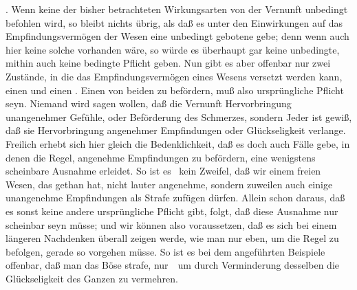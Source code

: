 \begin{aufza}
\begin{aufzb}
\item {}. Wenn keine der bisher betrachteten Wirkungsarten von der Vernunft unbedingt befohlen wird, so bleibt nichts übrig, als daß es unter den Einwirkungen auf das Empfindungsvermögen der Wesen eine unbedingt gebotene gebe; denn wenn auch hier keine solche vorhanden wäre, so würde es überhaupt gar keine unbedingte, mithin auch keine bedingte Pflicht geben. Nun gibt es aber offenbar nur zwei Zustände, in die das Empfindungsvermögen eines Wesens versetzt werden kann, einen  und einen . Einen von beiden zu befördern, muß also ursprüngliche Pflicht seyn. Niemand wird sagen wollen, daß die Vernunft Hervorbringung unangenehmer Gefühle, oder Beförderung des Schmerzes, sondern Jeder ist gewiß, daß sie Hervorbringung angenehmer Empfindungen oder Glückseligkeit verlange. Freilich erhebt sich hier gleich die Bedenklichkeit, daß es doch auch Fälle gebe, in denen die Regel, angenehme Empfindungen zu befördern, eine wenigstens scheinbare Ausnahme erleidet. So ist es \zB\ kein Zweifel, daß wir einem freien Wesen, das  gethan hat, nicht lauter angenehme, sondern zuweilen auch einige unangenehme Empfindungen als Strafe zufügen dürfen. Allein schon daraus, daß es sonst keine andere ursprüngliche Pflicht gibt, folgt, daß diese Ausnahme nur scheinbar seyn müsse; und wir können also voraussetzen, daß es sich bei einem längeren Nachdenken überall zeigen werde, wie man nur eben, um die Regel zu befolgen, gerade so vorgehen müsse. So ist es bei dem angeführten Beispiele offenbar, daß man das Böse strafe, nur~\ um durch Verminderung desselben die Glückseligkeit des Ganzen zu vermehren.
\end{aufzb}

\end{aufza}
